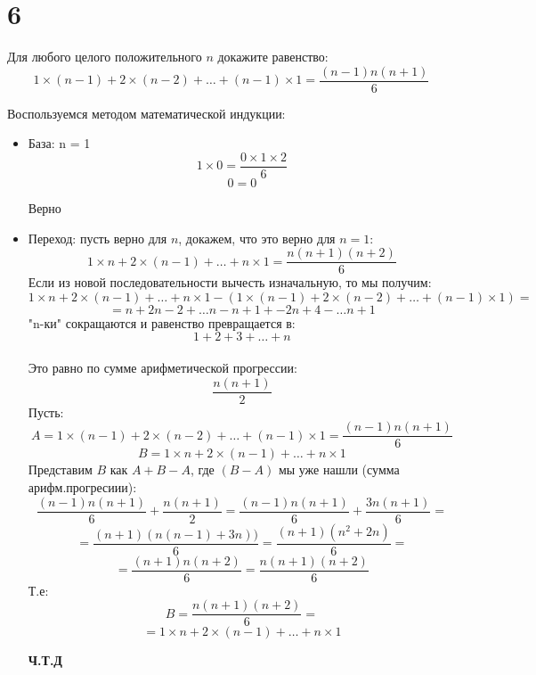 \documentclass[a4paper,12pt]{article}
\begin{document}
\section*{6}
Для любого целого положительного $n$ докажите равенство:
\[
1\times(n-1) + 2\times(n-2) + \ldots + (n-1)\times1 = \frac{(n-1)n(n+1)}{6}
\]
\begin{center}
Воспользуемся методом математической индукции:
\end{center}
\begin{itemize}
\item База:  n = 1
\[
1 \times 0 = \frac{0\times1\times2}{6}
\]
\[
0 = 0 
\]
\begin{center}
Верно
\end{center}
\item Переход: пусть верно для $n$, докажем, что это верно для $n=1$:
\[
1 \times n + 2\times(n-1) +\ldots + n \times 1 = \frac{n(n+1)(n+2)}{6}
\]
Если из новой последовательности вычесть изначальную, то мы получим:
\[
1 \times n + 2\times(n-1) +\ldots + n \times 1 - (1\times(n-1) + 2\times(n-2) + \ldots + (n-1)\times1)=
\]
\[
=n + 2n - 2 + \ldots n - n + 1 + -2n +4 - \ldots n + 1
\]
"n-ки" сокращаются и равенство превращается в:
\[
1 + 2 + 3 + \ldots + n
\]
\\
Это равно по сумме арифметической прогрессии:
\[
\frac{n(n+1)}{2}
\]
Пусть:
\[
A = 1\times(n-1) + 2\times(n-2) + \ldots + (n-1)\times1 =\frac{(n-1)n(n+1)}{6}
\]
\[
B = 1 \times n + 2\times(n-1) +\ldots + n \times 1
\]
Представим $ B $ как $A + B - A$, где $(B-A)$ мы уже нашли (сумма арифм.прогресиии):
\[
\frac{(n-1)n(n+1)}{6} + \frac{n(n+1)}{2} = \frac{(n-1)n(n+1)}{6} + \frac{3n(n+1)}{6}=
\]
\[
= \frac{(n+1)(n(n-1)+3n))}{6} = \frac{(n+1)(n^2+2n)}{6} = 
\]
\[
= \frac{(n+1)n(n+2)}{6} = \frac{n(n+1)(n+2)}{6}
\]
Т.е:
\[
B = \frac{n(n+1)(n+2)}{6} = 
\]
\[
= 1 \times n + 2\times(n-1) +\ldots + n \times 1
\]
\begin{center}

\textbf{Ч.Т.Д}
\end{center}
\end{itemize}
\end{document}
